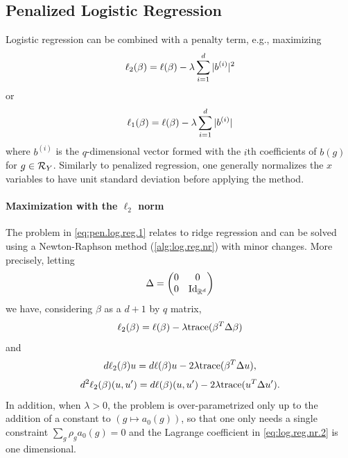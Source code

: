 \subsection{Penalized Logistic Regression}


Logistic regression can be combined with a penalty term, e.g., maximizing 
\begin{equation}
\label{eq:pen.log.reg.1}
\ell_2(\beta) = \ell(\beta) - \lambda \sum_{i=1}^d |b^{(i)}|^2
\end{equation}
or
\begin{equation}
\label{eq:pen.log.reg.2}
\ell_1(\beta) = \ell(\beta) - \lambda \sum_{i=1}^d |b^{(i)}|
\end{equation}
where $b^{(i)}$ is the $q$-dimensional vector formed with the $i$th coefficients of $b(g)$ for $g\in{\mathcal R}_Y$. 
Similarly to penalized regression, one generally normalizes the $x$ variables to have unit standard deviation before applying the method.

\paragraph{Maximization with the $\ell_2$ norm}
The problem in \cref{eq:pen.log.reg.1} relates to ridge regression and can be solved using a Newton-Raphson method (\cref{alg:log.reg.nr}) with minor changes. More precisely, letting 
\[
\Delta = \begin{pmatrix}
0 & 0 \\
0 & \Id[d]
\end{pmatrix}
\] 
we have, considering $\beta$ as a $d+1$ by $q$ matrix,
\[
\ell_2(\beta) = \ell(\beta) - \lambda {\mathrm{trace}}(\beta^T \Delta \beta)
\]
and
\[
d\ell_2(\beta) u = d\ell(\beta) u - 2\lambda {\mathrm{trace}}(\beta^T \Delta u),
\]
\[
d^2\ell_2(\beta) (u, u') = d\ell(\beta) (u, u') - 2\lambda {\mathrm{trace}}(u^T \Delta u').
\]
In addition, when $\lambda >0$, the problem is over-parametrized only up to the addition of a constant to $(g\mapsto {a_0}(g))$, so that one only needs a single constraint $\sum_g \rho_g {a_0}(g) = 0$ and the Lagrange coefficient in \cref{eq:log.reg.nr.2} is one dimensional. 




